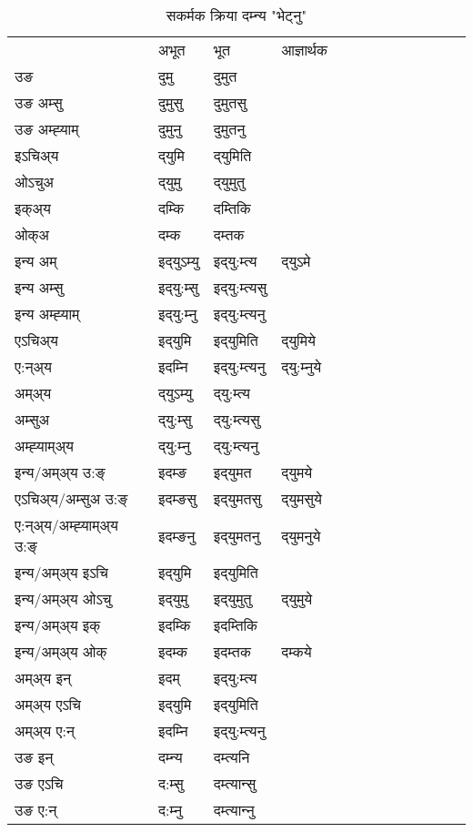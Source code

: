 \begin{table}[H]
\centering
\caption{\label{um.vt} सकर्मक क्रिया  दम्‍न्य  "भेट्नु"  }
\begin{tabular}{l|l|l|l|l|l|l|l|l|l|l|l|l}  \toprule
&अभूत & भूत & आज्ञार्थक \\ 
उङ &दुमु &दुमुत \\ 
उङ अम्सु &दुमुसु &दुमुतसु \\ 
उङ अम्ह्‍याम् &दुमुनु &दुमुतनु \\ 
इऽचिअ्य &द्‌युमि &द्‌युमिति   \\ 
ओऽचुअ &द्‌युमु &द्‌युमुतु   \\ 
इक्अ्य &दम्कि &दम्तिकि   \\ 
ओक्अ &दम्क &दम्तक   \\ 
इन्य अम् & इद्‌युऽम्यु  & इद्‌यु:म्त्य &द्‌युऽमे  \\ 
इन्य अम्सु & इद्‌यु:म्सु  & इद्‌यु:म्त्यसु   \\ 
इन्य अम्ह्‍याम् & इद्‌यु:म्‍नु  & इद्‌यु:म्त्यनु   \\ 
एऽचिअ्य & इद्‌युमि & इद्‌युमिति &द्‌युमिये    \\ 
ए:न्अ्य & इदम्‍नि  & इद्‌यु:म्त्यनु &द्‌यु:म्‍नुये  \\ 
अम्अ्य & द्‌युऽम्यु  & द्‌यु:म्त्य  \\ 
अम्सुअ & द्‌यु:म्सु & द्‌यु:म्त्यसु  \\ 
अम्ह्‍याम्अ्य & द्‌यु:म्‍नु  & द्‌यु:म्त्यनु \\ 
\midrule
इन्य/अम्अ्य उ:ङ्‌&इदम्ङ & इद्‌युमत &द्‌युमये \\ 
एऽचिअ्य/अम्सुअ उ:ङ्‌ &इदम्ङसु & इद्‌युमतसु &द्‌युमसुये \\ 
ए:न्अ्य/अम्ह्‍याम्अ्य उ:ङ्‌ &इदम्ङनु & इद्‌युमतनु &द्‌युमनुये \\ 
इन्य/अम्अ्य इऽचि & इद्‌युमि & इद्‌युमिति    \\ 
इन्य/अम्अ्य ओऽचु & इद्‌युमु & इद्‌युमुतु  &द्‌युमुये  \\ 
इन्य/अम्अ्य इक् & इदम्कि & इदम्तिकि   \\ 
इन्य/अम्अ्य ओक् & इदम्क & इदम्तक  &दम्कये  \\ 
अम्अ्य इन् & इदम् & इद्‌यु:म्त्य   \\ 
अम्अ्य एऽचि & इद्‌युमि & इद्‌युमिति    \\ 
अम्अ्य ए:न् & इदम्‍नि  & इद्‌यु:म्त्यनु  \\ 
\midrule
उङ इन् & दम्‍न्य  & दम्त्यनि  \\ 
उङ एऽचि & द:म्सु  & दम्त्यान्सु   \\ 
उङ ए:न्& द:म्‍नु  & दम्त्यान्‍नु   \\ 
\bottomrule
\end{tabular}
\end{table}



